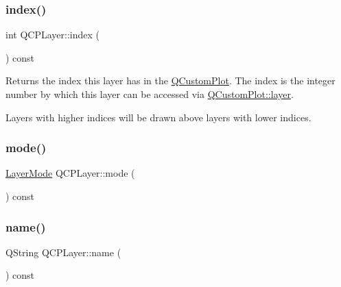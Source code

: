 \mbox{\label{class_q_c_p_layer_ad322905c4700dcc7ceba63e011c730d2}} 
\subsubsection{\texorpdfstring{index()}{index()}}
{\footnotesize\ttfamily int Q\+C\+P\+Layer\+::index (\begin{DoxyParamCaption}{ }\end{DoxyParamCaption}) const\hspace{0.3cm}{\ttfamily [inline]}}

Returns the index this layer has in the \hyperlink{class_q_custom_plot}{Q\+Custom\+Plot}. The index is the integer number by which this layer can be accessed via \hyperlink{class_q_custom_plot_a0a96244e7773b242ef23c32b7bdfb159}{Q\+Custom\+Plot\+::layer}.

Layers with higher indices will be drawn above layers with lower indices. \mbox{\label{class_q_c_p_layer_a44ae50b011b19f3dd46a38d8e2e2c1b6}} 
\subsubsection{\texorpdfstring{mode()}{mode()}}
{\footnotesize\ttfamily \hyperlink{class_q_c_p_layer_a67dcfc1590be2a1f2227c5a39bb59c7c}{Layer\+Mode} Q\+C\+P\+Layer\+::mode (\begin{DoxyParamCaption}{ }\end{DoxyParamCaption}) const\hspace{0.3cm}{\ttfamily [inline]}}

\mbox{\label{class_q_c_p_layer_a37806f662b50b588fb1029a14fc5ef50}} 
\subsubsection{\texorpdfstring{name()}{name()}}
{\footnotesize\ttfamily Q\+String Q\+C\+P\+Layer\+::name (\begin{DoxyParamCaption}{ }\end{DoxyParamCaption}) const\hspace{0.3cm}{\ttfamily [inline]}}

